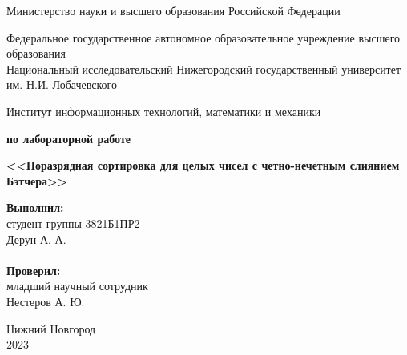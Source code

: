 \documentclass{report}
\begin{document}
\begin{titlepage}

\begin{center}
Министерство науки и высшего образования Российской Федерации
\end{center}

\begin{center}
Федеральное государственное автономное образовательное учреждение высшего образования \\
Национальный исследовательский Нижегородский государственный университет им. Н.И. Лобачевского
\end{center}

\begin{center}
Институт информационных технологий, математики и механики
\end{center}

\vspace{4em}

\begin{center}
\textbf{ по лабораторной работе} \\
\end{center}
\begin{center}
\textbf{\Large<<Поразрядная сортировка для целых чисел с четно-нечетным слиянием Бэтчера>>} \\
\end{center}

\vspace{4em}

\newbox{\lbox}
\newlength{\maxl}
\setlength{\maxl}{\wd\lbox}
\hfill\parbox{7cm}{
\hspace*{5cm}\hspace*{-5cm}\textbf{Выполнил:} \\ студент группы 3821Б1ПР2\\Дерун А. А.\\
\\
\hspace*{5cm}\hspace*{-5cm}\textbf{Проверил:}\\ младший научный сотрудник\\Нестеров А. Ю.\\
}
\vspace{\fill}

\begin{center} Нижний Новгород \\ 2023 \end{center}

\end{titlepage}
\end{document}
